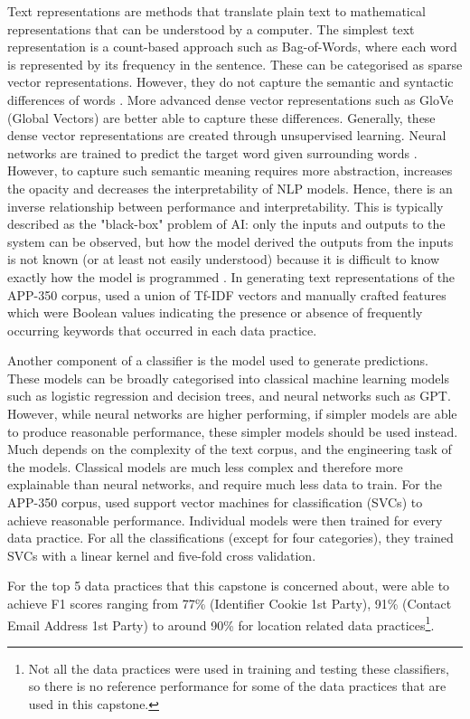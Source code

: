 Text representations are methods that translate plain text to mathematical representations that can be understood by a computer. The simplest text representation is a count-based approach such as Bag-of-Words, where each word is represented by its frequency in the sentence. These can be categorised as sparse vector representations. However, they do not capture the semantic and syntactic differences of words \cite{liu2020word}. More advanced dense vector representations such as GloVe (Global Vectors) are better able to capture these differences. Generally, these dense vector representations are created through unsupervised learning. Neural networks are trained to predict the target word given surrounding words \cite{liu2020word}. However, to capture such semantic meaning requires more abstraction, increases the opacity and decreases the interpretability of NLP models. Hence, there is an inverse relationship between performance and interpretability. This is typically described as the "black-box" problem of AI: only the inputs and outputs to the system can be observed, but how the model derived the outputs from the inputs is not known (or at least not easily understood) because it is difficult to know exactly how the model is programmed \cite{zednik2021}. In generating text representations of the APP-350 corpus, \cite{zimmeck2019} used a union of Tf-IDF vectors and manually crafted features which were Boolean values indicating the presence or absence of frequently occurring keywords that occurred in each data practice.

Another component of a classifier is the model used to generate predictions. These models can be broadly categorised into classical machine learning models such as logistic regression and decision trees, and neural networks such as GPT. However, while neural networks are higher performing, if simpler models are able to produce reasonable performance, these simpler models should be used instead. Much depends on the complexity of the text corpus, and the engineering task of the models. Classical models are much less complex and therefore more explainable than neural networks, and require much less data to train. For the APP-350 corpus, \cite{zimmeck2019} used support vector machines for classification (SVCs) to achieve reasonable performance. Individual models were then trained for every data practice. For all the classifications (except for four categories), they trained SVCs with a linear kernel and five-fold cross validation.

For the top 5 data practices that this capstone is concerned about, \cite{zimmeck2019} were able to achieve F1 scores ranging from 77\% (Identifier Cookie 1st Party), 91\% (Contact Email Address 1st Party) to around 90\% for location related data practices\footnote{Not all the data practices were used in training and testing these classifiers, so there is no reference performance for some of the data practices that are used in this capstone.}.

